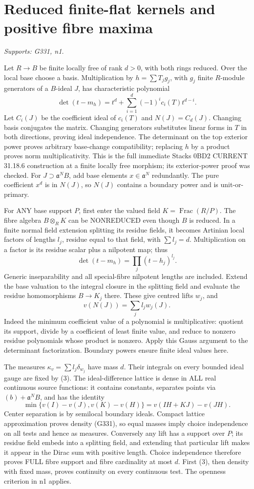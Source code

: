 \documentclass[11pt]{article}
\begin{document}
\section{Reduced finite-flat kernels and positive fibre maxima}
\textit{Supports: G331, n1.}

Let $R\to B$ be finite locally free of rank $d>0$, with both rings reduced. Over the local base choose a basis. Multiplication by $h=\sum T_jg_j$, with $g_j$ finite $R$-module generators of a $B$-ideal $J$, has characteristic polynomial
\[
\det(t-m_h)=t^d+\sum_{i=1}^d(-1)^ic_i(T)t^{d-i}.
\]
Let $C_i(J)$ be the coefficient ideal of $c_i(T)$ and $N(J)=C_d(J)$. Changing basis conjugates the matrix. Changing generators substitutes linear forms in $T$ in both directions, proving ideal independence. The determinant on the top exterior power proves arbitrary base-change compatibility; replacing $h$ by a product proves norm multiplicativity. This is the full immediate Stacks 0BD2 CURRENT 31.18.6 construction at a finite locally free morphism; its exterior-power proof was checked. For $J\supset\mathfrak a^NB$, add base elements $x\in\mathfrak a^N$ redundantly. The pure coefficient $x^d$ is in $N(J)$, so $N(J)$ contains a boundary power and is unit-or-primary.

For ANY base support $P$, first enter the valued field $K=\operatorname{Frac}(R/P)$. The fibre algebra $B\otimes_RK$ can be NONREDUCED even though $B$ is reduced. In a finite normal field extension splitting its residue fields, it becomes Artinian local factors of lengths $l_j$, residue equal to that field, with $\sum l_j=d$. Multiplication on a factor is its residue scalar plus a nilpotent map; thus
\[
\det(t-m_h)=\prod_j(t-h_j)^{l_j}.
\]
Generic inseparability and all special-fibre nilpotent lengths are included. Extend the base valuation to the integral closure in the splitting field and evaluate the residue homomorphisms $B\to K_j$ there. These give centred lifts $w_j$, and
\[
v(N(J))=\sum_j l_jw_j(J).                              \tag{3}
\]
Indeed the minimum coefficient value of a polynomial is multiplicative: quotient its support, divide by a coefficient of least finite value, and reduce to nonzero residue polynomials whose product is nonzero. Apply this Gauss argument to the determinant factorization. Boundary powers ensure finite ideal values here.

The measures $\kappa_v=\sum l_j\delta_{w_j}$ have mass $d$. Their integrals on every bounded ideal gauge are fixed by (3). The ideal-difference lattice is dense in ALL real continuous source functions: it contains constants, separates points via $(b)+\mathfrak a^N B$, and has the identity
\[
\min\{v(I)-v(J),v(K)-v(H)\}=v(IH+KJ)-v(JH).
\]
Center separation is by semilocal boundary ideals. Compact lattice approximation proves density (G331), so equal masses imply choice independence on all tests and hence as measures. Conversely any lift has a support over $P$; its residue field embeds into a splitting field, and extending that particular lift makes it appear in the Dirac sum with positive length. Choice independence therefore proves FULL fibre support and fibre cardinality at most $d$. First (3), then density with fixed mass, proves continuity on every continuous test. The openness criterion in n1 applies.
\end{document}
